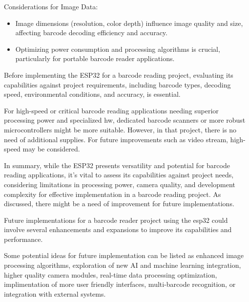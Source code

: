 Considerations for Image Data:

\begin{itemize}
    \item Image dimensions (resolution, color depth) influence image quality and size, affecting barcode decoding efficiency and accuracy.
    \item Optimizing power consumption and processing algorithms is crucial, particularly for portable barcode reader applications.
\end{itemize}

Before implementing the ESP32 for a barcode reading project, evaluating its capabilities against project requirements, including barcode types, decoding speed, environmental conditions, and accuracy, is essential.

\medskip

For high-speed or critical barcode reading applications needing superior processing power and specialized \ac{hw}, dedicated barcode scanners or more robust microcontrollers might be more suitable. However, in that project, there is no need of additional supplies. For future improvements such as video stream, high-speed may be considered.

\medskip

In summary, while the ESP32 presents versatility and potential for barcode reading applications, it's vital to assess its capabilities against project needs, considering limitations in processing power, camera quality, and development complexity for effective implementation in a barcode reading project. As discussed, there might be a need of improvement for future implementations. 

\medskip

Future implementations for a barcode reader project using the \ac{esp32} could involve several enhancements and expansions to improve its capabilities and performance. 

\medskip

Some potential ideas for future implementation can be listed as enhanced image processing algorithms, exploration of new AI and machine learning integration, higher quality camera modules, real-time data processing optimization, implimentation of more user friendly interfaces, multi-barcode recognition, or integration with external systems.

